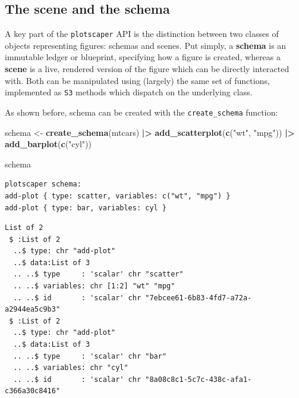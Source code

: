 \documentclass[
  openany]{book}
\newenvironment{Shaded}{\begin{snugshade}}{\end{snugshade}}
\newcommand{\FunctionTok}[1]{\textcolor[rgb]{0.13,0.29,0.53}{\textbf{#1}}}
\newcommand{\NormalTok}[1]{#1}
\newcommand{\OtherTok}[1]{\textcolor[rgb]{0.56,0.35,0.01}{#1}}
\newcommand{\SpecialCharTok}[1]{\textcolor[rgb]{0.81,0.36,0.00}{\textbf{#1}}}
\newcommand{\StringTok}[1]{\textcolor[rgb]{0.31,0.60,0.02}{#1}}
\theoremstyle{definition}
\theoremstyle{definition}
\theoremstyle{definition}
\theoremstyle{definition}
\theoremstyle{remark}
\begin{document}
\subsection{The scene and the schema}\label{scene-and-schema}

A key part of the \texttt{plotscaper} API is the distinction between two classes of objects representing figures: schemas and scenes. Put simply, a \textbf{schema} is an immutable ledger or blueprint, specifying how a figure is created, whereas a \textbf{scene} is a live, rendered version of the figure which can be directly interacted with. Both can be manipulated using (largely) the same set of functions, implemented as \texttt{S3} methods which dispatch on the underlying class.

As shown before, schema can be created with the \texttt{create\_schema} function:

\begin{Shaded}
\begin{Highlighting}[]
\NormalTok{schema }\OtherTok{\textless{}{-}} \FunctionTok{create\_schema}\NormalTok{(mtcars) }\SpecialCharTok{|\textgreater{}}
  \FunctionTok{add\_scatterplot}\NormalTok{(}\FunctionTok{c}\NormalTok{(}\StringTok{"wt"}\NormalTok{, }\StringTok{"mpg"}\NormalTok{)) }\SpecialCharTok{|\textgreater{}}
  \FunctionTok{add\_barplot}\NormalTok{(}\FunctionTok{c}\NormalTok{(}\StringTok{"cyl"}\NormalTok{))}

\NormalTok{schema}
\end{Highlighting}
\end{Shaded}

\begin{verbatim}
plotscaper schema:
add-plot { type: scatter, variables: c("wt", "mpg") }
add-plot { type: bar, variables: cyl }
\end{verbatim}

\begin{Shaded}
\end{Shaded}

\begin{verbatim}
List of 2
 $ :List of 2
  ..$ type: chr "add-plot"
  ..$ data:List of 3
  .. ..$ type     : 'scalar' chr "scatter"
  .. ..$ variables: chr [1:2] "wt" "mpg"
  .. ..$ id       : 'scalar' chr "7ebcee61-6b83-4fd7-a72a-a2944ea5c9b3"
 $ :List of 2
  ..$ type: chr "add-plot"
  ..$ data:List of 3
  .. ..$ type     : 'scalar' chr "bar"
  .. ..$ variables: chr "cyl"
  .. ..$ id       : 'scalar' chr "8a08c8c1-5c7c-438c-afa1-c366a30c8416"
\end{verbatim}
\end{document}

